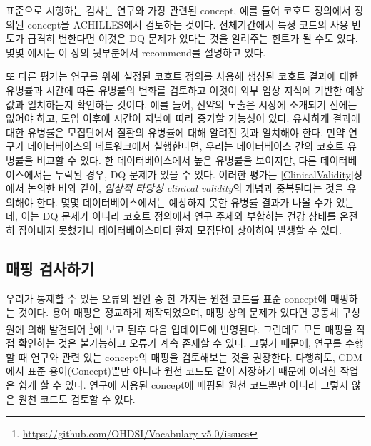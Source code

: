 \documentclass[10.5pt]{book}
\let\rmarkdownfootnote\footnote%
\def\footnote{\protect\rmarkdownfootnote}
\theoremstyle{definition}
\theoremstyle{definition}
\theoremstyle{definition}
\theoremstyle{remark}
\begin{document}
표준으로 시행하는 검사는 연구와 가장 관련된 concept, 예를 들어 코호트
정의에서 정의된 concept을 ACHILLES에서 검토하는 것이다. 전체기간에서
특정 코드의 사용 빈도가 급격히 변한다면 이것은 DQ 문제가 있다는 것을
알려주는 힌트가 될 수도 있다. 몇몇 예시는 이 장의 뒷부분에서 recommend를
설명하고 있다.

또 다른 평가는 연구를 위해 설정된 코호트 정의를 사용해 생성된 코호트
결과에 대한 유병률과 시간에 따른 유병률의 변화를 검토하고 이것이 외부
임상 지식에 기반한 예상값과 일치하는지 확인하는 것이다. 예를 들어,
신약의 노출은 시장에 소개되기 전에는 없어야 하고, 도입 이후에 시간이
지남에 따라 증가할 가능성이 있다. 유사하게 결과에 대한 유병률은
모집단에서 질환의 유병률에 대해 알려진 것과 일치해야 한다. 만약 연구가
데이터베이스의 네트워크에서 실행한다면, 우리는 데이터베이스 간의 코호트
유병률을 비교할 수 있다. 한 데이터베이스에서 높은 유병률을 보이지만,
다른 데이터베이스에서는 누락된 경우, DQ 문제가 있을 수 있다. 이러한
평가는 \ref{ClinicalValidity}장에서 논의한 바와 같이, \emph{임상적
타당성 clinical validity}의 개념과 중복된다는 것을 유의해야 한다. 몇몇
데이터베이스에서는 예상하지 못한 유병률 결과가 나올 수가 있는데, 이는 DQ
문제가 아니라 코호트 정의에서 연구 주제와 부합하는 건강 상태를 온전히
잡아내지 못했거나 데이터베이스마다 환자 모집단이 상이하여 발생할 수
있다.

\subsection{매핑 검사하기}\label{-}

우리가 통제할 수 있는 오류의 원인 중 한 가지는 원천 코드를 표준
concept에 매핑하는 것이다. 용어 매핑은 정교하게 제작되었으며, 매핑 상의
문제가 있다면 공동체 구성원에 의해 발견되어 \footnote{\url{https://github.com/OHDSI/Vocabulary-v5.0/issues}}에
보고 된후 다음 업데이트에 반영된다. 그런데도 모든 매핑을 직접 확인하는
것은 불가능하고 오류가 계속 존재할 수 있다. 그렇기 때문에, 연구를 수행할
때 연구와 관련 있는 concept의 매핑을 검토해보는 것을 권장한다. 다행히도,
CDM에서 표준 용어(Concept)뿐만 아니라 원천 코드도 같이 저장하기 때문에
이러한 작업은 쉽게 할 수 있다. 연구에 사용된 concept에 매핑된 원천
코드뿐만 아니라 그렇지 않은 원천 코드도 검토할 수 있다.
\end{document}
